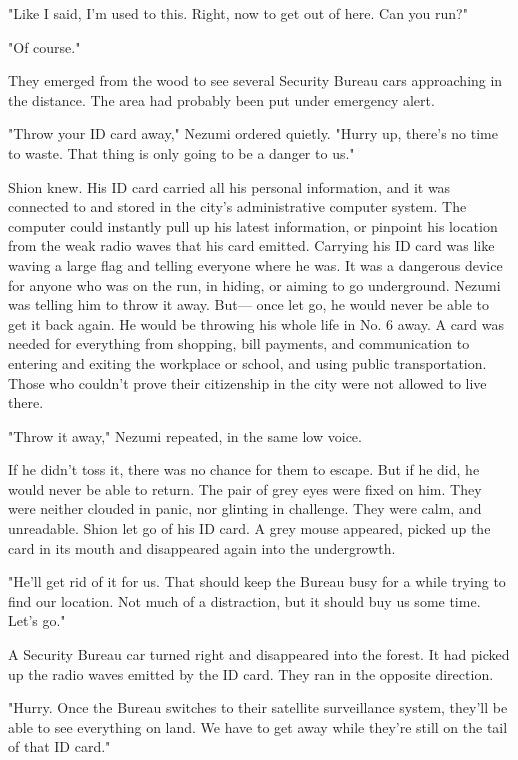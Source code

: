 "Like I said, I'm used to this. Right, now to get out of here. Can you
run?"

"Of course."

They emerged from the wood to see several Security Bureau cars
approaching in the distance. The area had probably been put under
emergency alert.

"Throw your ID card away," Nezumi ordered quietly. "Hurry up, there's no
time to waste. That thing is only going to be a danger to us."

Shion knew. His ID card carried all his personal information, and it was
connected to and stored in the city's administrative computer system.
The computer could instantly pull up his latest information, or pinpoint
his location from the weak radio waves that his card emitted. Carrying
his ID card was like waving a large flag and telling everyone where he
was. It was a dangerous device for anyone who was on the run, in hiding,
or aiming to go underground. Nezumi was telling him to throw it away.
But--- once let go, he would never be able to get it back again. He would
be throwing his whole life in No. 6 away. A card was needed for
everything from shopping, bill payments, and communication to entering
and exiting the workplace or school, and using public transportation.
Those who couldn't prove their citizenship in the city were not allowed
to live there.

"Throw it away," Nezumi repeated, in the same low voice.

If he didn't toss it, there was no chance for them to escape. But if he
did, he would never be able to return. The pair of grey eyes were fixed
on him. They were neither clouded in panic, nor glinting in challenge.
They were calm, and unreadable. Shion let go of his ID card. A grey
mouse appeared, picked up the card in its mouth and disappeared again
into the undergrowth.

"He'll get rid of it for us. That should keep the Bureau busy for a
while trying to find our location. Not much of a distraction, but it
should buy us some time. Let's go."

A Security Bureau car turned right and disappeared into the forest. It
had picked up the radio waves emitted by the ID card. They ran in the
opposite direction.

"Hurry. Once the Bureau switches to their satellite surveillance system,
they'll be able to see everything on land. We have to get away while
they're still on the tail of that ID card."

